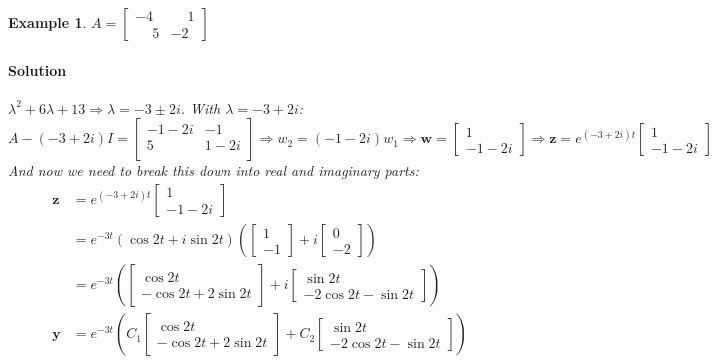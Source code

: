 \documentclass[letterpaper, 11pt, openany]{book}
\theoremstyle{mytheoremstyle}
\theoremstyle{myexamplestyle}
\newtheorem{example}{Example}[section]
\newenvironment{solution}{\paragraph{\sffamily \smaller \fontseries{b}\selectfont Solution}}{\hfill\faSquare}
\begin{document}
\begin{example}\label{e:de-comp-conj-neg-real}
    \(A = \begin{bmatrix}
        -4 &  \phantom{-}1 \\
         \phantom{-}5 &  -2
    \end{bmatrix}\)
    \begin{solution}
        \(\lambda ^2 + 6 \lambda + 13 \Rightarrow \lambda = -3 \pm 2i\). With \(\lambda = -3 + 2i\):
        \[A - (-3+2i)I = \begin{bmatrix}
            -1-2 i & -1 \\
                5 & 1-2 i \\
        \end{bmatrix} \Rightarrow w_{2} = (-1-2i)w_{1} \Rightarrow \mathbf{w} = \begin{bmatrix}1 \\ -1 - 2i\end{bmatrix} \Rightarrow \mathbf{z} = e^{(-3 + 2i)t}\begin{bmatrix}1 \\ -1 - 2i\end{bmatrix}\]
        And now we need to break this down into real and imaginary parts:
        \begin{align*}
            \mathbf{z} &= e^{(-3 + 2i)t}\begin{bmatrix}1 \\ -1 - 2i\end{bmatrix}\\
                        &= e^{-3t}\left(\cos 2t + i \sin 2t\right)\left(\begin{bmatrix}1 \\ -1\end{bmatrix} + i \begin{bmatrix}0 \\ -2\end{bmatrix}\right)\\
                        &= e^{-3t} \left(\begin{bmatrix}\cos 2t \\ -\cos 2t + 2 \sin 2t\end{bmatrix} + i \begin{bmatrix}\sin 2t\\ -2\cos 2t - \sin 2t\end{bmatrix}\right)\\
            \mathbf{y} &= e^{-3t}\left(C_{1} \begin{bmatrix}\cos 2t \\ -\cos 2t + 2 \sin 2t\end{bmatrix} + C_{2}\begin{bmatrix}\sin 2t\\ -2\cos 2t - \sin 2t\end{bmatrix}\right)

\end{align*}
\end{solution}
\end{example}
\end{document}
